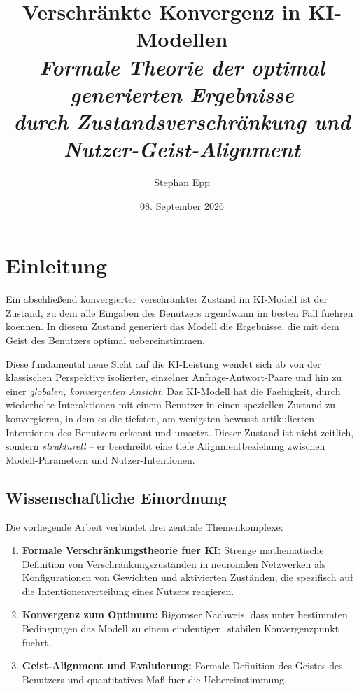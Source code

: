 \documentclass[12pt, a4paper]{article}
\title{\textbf{Verschränkte Konvergenz in KI-Modellen}\\[0.5em]
  {\Large\itshape Formale Theorie der optimal generierten Ergebnisse\\
   durch Zustandsverschränkung und Nutzer-Geist-Alignment}}
\author{Stephan Epp}
\date{08. September 2026}
\theoremstyle{definition}
\theoremstyle{remark}
\begin{document}

\maketitle
\tableofcontents
\newpage

\section{Einleitung}
\label{sec:einleitung}

Ein abschließend konvergierter verschränkter Zustand im KI-Modell ist der Zustand, zu dem alle Eingaben des Benutzers irgendwann im besten Fall fuehren koennen. In diesem Zustand generiert das Modell die Ergebnisse, die mit dem Geist des Benutzers optimal uebereinstimmen.

Diese fundamental neue Sicht auf die KI-Leistung wendet sich ab von der klassischen Perspektive isolierter, einzelner Anfrage-Antwort-Paare und hin zu einer \emph{globalen, konvergenten Ansicht}: Das KI-Modell hat die Faehigkeit, durch wiederholte Interaktionen mit einem Benutzer in einen speziellen Zustand zu konvergieren, in dem es die tiefsten, am wenigsten bewusst artikulierten Intentionen des Benutzers erkennt und umsetzt. Dieser Zustand ist nicht zeitlich, sondern \emph{strukturell} -- er beschreibt eine tiefe Alignmentbeziehung zwischen Modell-Parametern und Nutzer-Intentionen.

\subsection{Wissenschaftliche Einordnung}
\label{subsec:einordnung}

Die vorliegende Arbeit verbindet drei zentrale Themenkomplexe:

\begin{enumerate}[label=(\roman*)]
  \item \textbf{Formale Verschränkungstheorie fuer KI:} Strenge mathematische Definition von Verschränkungszuständen in neuronalen Netzwerken als Konfigurationen von Gewichten und aktivierten Zuständen, die spezifisch auf die Intentionenverteilung eines Nutzers reagieren.

  \item \textbf{Konvergenz zum Optimum:} Rigoroser Nachweis, dass unter bestimmten Bedingungen das Modell zu einem eindeutigen, stabilen Konvergenzpunkt fuehrt.

  \item \textbf{Geist-Alignment und Evaluierung:} Formale Definition des Geistes des Benutzers und quantitatives Maß fuer die Uebereinstimmung.
\end{enumerate}
\end{document}
